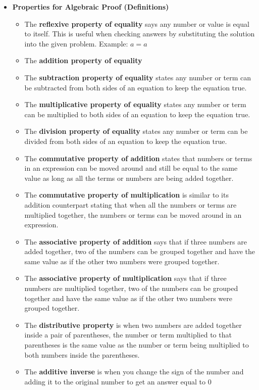 \documentclass{report}
\begin{document}
\begin{itemize}
        \item \textbf{Properties for Algebraic Proof (Definitions)}
          \begin{itemize}
            \item The \textbf{reflexive property of equality} says any number or value is equal to itself. This is useful when checking answers by substituting the solution into the given problem. Example: $a=a$
          \item The \textbf{addition property of equality} 
          \item The \textbf{subtraction property of equality} states any number or term can be subtracted from both sides of an equation to keep the equation true. 
          \item The \textbf{multiplicative property of equality} states any number or term can be multiplied to both sides of an equation to keep the equation true.
            \item The \textbf{division property of equality} states any number or term can be divided from both sides of an equation to keep the equation true.
            \item The \textbf{commutative property of addition} states that numbers or terms in an expression can be moved around and still be equal to the same value as long as all the terms or numbers are being added together. 
            \item The \textbf{commutative property of multiplication} is similar to its addition counterpart stating that when all the numbers or terms are multiplied together, the numbers or terms can be moved around in an expression. 
            \item The \textbf{associative property of addition} says that if three numbers are added together, two of the numbers can be grouped together and have the same value as if the other two numbers were grouped together. 
            \item The \textbf{associative property of multiplication} says that if three numbers are multiplied together, two of the numbers can be grouped together and have the same value as if the other two numbers were grouped together. 
            \item The \textbf{distributive property} is when two numbers are added together inside a pair of parentheses, the number or term multiplied to that parentheses is the same value as the number or term being multiplied to both numbers inside the parentheses. 
            \item The \textbf{additive inverse} is when you change the sign of the number and adding it to the original number to get an answer equal to 0

\end{itemize}
\end{itemize}
\end{document}
